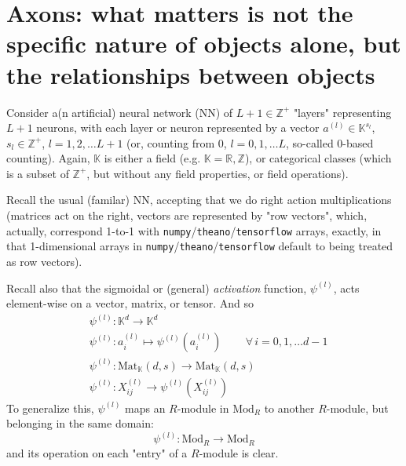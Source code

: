 \documentclass[10pt]{amsart}
\begin{document}

\section{Axons: what matters is not the specific nature of objects alone, but the relationships between objects} \label{Sec:Axons}

Consider a(n artificial) neural network (NN) of $L+1 \in \mathbb{Z}^+$ "layers" representing $L+1$ neurons, with each layer or neuron represented by a vector $a^{(l)} \in \mathbb{K}^{s_l}$, $s_l \in \mathbb{Z}^+$, $l=1,2,\dots L+1$ (or, counting from $0$, $l=0,1,\dots L$, so-called $0$-based counting).  Again, $\mathbb{K}$ is either a field (e.g. $\mathbb{K}=\mathbb{R},\mathbb{Z}$), or categorical classes (which is a subset of $\mathbb{Z}^+$, but without any field properties, or field operations).  


Recall the usual (familar) NN, accepting that we do right action multiplications (matrices act on the right, vectors are represented by "row vectors", which, actually, correspond 1-to-1 with \verb|numpy|/\verb|theano|/\verb|tensorflow| arrays, exactly, in that 1-dimensional arrays in \verb|numpy|/\verb|theano|/\verb|tensorflow| default to being treated as row vectors).  

Recall also that the sigmoidal or (general) \emph{activation} function, $\psi^{(l)}$, acts element-wise on a vector, matrix, or tensor.  And so 
\[
\begin{aligned}
	& \psi^{(l)}:\mathbb{K}^d \to \mathbb{K}^d \\ 
	& \psi^{(l)}: a^{(l)}_i \mapsto \psi^{(l)}(a_i^{(l)}) \qquad \, \forall \, i =0,1, \dots d-1  \\
	& \psi^{(l)} : \text{Mat}_{\mathbb{K}}(d,s) \to \text{Mat}_{\mathbb{K}}(d,s) \\
	& \psi^{(l)} : X^{(l)}_{ij} \to \psi^{(l)}(X^{(l)}_{ij} )  
\end{aligned}
\]
To generalize this, $\psi^{(l)}$ maps an $R$-module in $\text{Mod}_R$ to another $R$-module, but belonging in the same domain:
\[
\psi^{(l)} :\text{Mod}_R \to \text{Mod}_R
\]
and its operation on each "entry" of a $R$-module is clear.  
\end{document}
